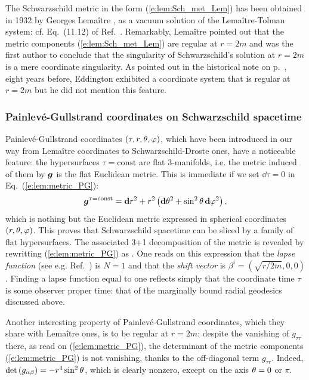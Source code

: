 \begin{hist}
The Schwarzschild metric in the form (\ref{e:lem:Sch_met_Lem}) has
been obtained in 1932 by Georges Lemaître \cite{Lemai32},
as a vacuum solution of the Lemaître-Tolman system: cf. Eq.~(11.12) of Ref.~\cite{Lemai32}.
Remarkably, Lemaître pointed out that the metric components (\ref{e:lem:Sch_met_Lem}) are
regular at $r=2m$ and was the first author to conclude that the singularity of
Schwarzschild's solution at $r=2m$ is a mere coordinate singularity.
As pointed out in the historical note on p.~\pageref{n:sch:Eddington_coord}, eight years before,
Eddington exhibited a coordinate system that is regular at $r=2m$ \cite{Eddin1924} but he
did not mention this feature.
\end{hist}

\subsubsection{Painlevé-Gullstrand coordinates on Schwarzschild spacetime}

Painlevé-Gullstrand coordinates $(\tau,r,\theta,\varphi)$,
which have been introduced
in our way from Lemaître coordinates to Schwarzschild-Droste ones,
have a noticeable feature: the hypersurfaces $\tau=\mathrm{const}$ are
flat 3-manifolds, i.e. the metric induced of them by $\bm{g}$ is the flat Euclidean metric.
This is immediate if we set $\dd\tau=0$ in Eq.~(\ref{e:lem:metric_PG}):
\[
    \bm{g}^{\tau=\mathrm{const}} = \mathbf{d} r^2 + r^2 \left( \mathbf{d}\theta^2 + \sin^2\theta\, \mathbf{d}\varphi^2 \right) ,
\]
which is nothing but the Euclidean metric expressed in spherical coordinates
$(r,\theta,\varphi)$. This proves that Schwarzschild spacetime can be sliced
by a family of flat hypersurfaces. The associated 3+1 decomposition
of the metric is revealed by rewritting (\ref{e:lem:metric_PG})
as
\be
        .
\ee
One reads on this expression that the \emph{lapse function}
(see e.g. Ref.~\cite{Gourg12}) is $N=1$ and that the \emph{shift vector}
is $\beta^i = (\sqrt{r/2m},0,0)$. Finding a lapse function equal to one reflects simply
that the coordinate time $\tau$ is some observer proper time: that of the
marginally bound radial geodesics discussed above.

Another interesting property of Painlevé-Gullstrand coordinates, which they
share with Lemaître ones, is to be regular at $r=2m$: despite the vanishing of
$g_{\tau\tau}$ there, as read on (\ref{e:lem:metric_PG}), the determinant
of the metric components (\ref{e:lem:metric_PG}) is not vanishing,
thanks to the off-diagonal term $g_{\tau r}$. Indeed, $\det\left( g_{\alpha\beta}\right) = -r^4\sin^2\theta$, which is clearly nonzero, except on the
axis $\theta=0$ or $\pi$.

